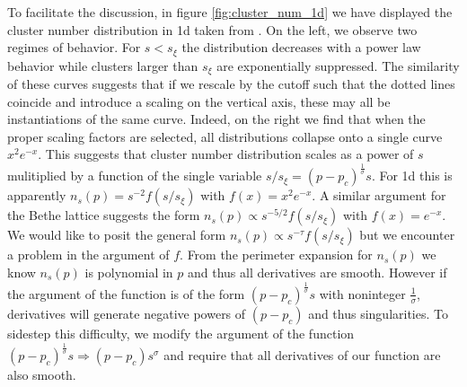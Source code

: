 To facilitate the discussion, in figure
\ref{fig:cluster_num_1d} we have displayed the cluster number distribution in 1d
taken from \cite{Christensen2002}.  On the left, we observe two regimes of behavior.
For $s<s_\xi$ the distribution decreases with a power law behavior while clusters
larger than $s_\xi$ are exponentially suppressed. The similarity of these curves
suggests that if we rescale by the cutoff such that the dotted lines coincide
and introduce a scaling on the vertical axis, these may all be instantiations
of the same curve.  Indeed, on the right we find that when the proper scaling
factors are selected, all distributions collapse onto a single curve $x^2 e^{-x}$.
This suggests that cluster number distribution scales as a power of $s$
mulitiplied by a function
of the single variable $s/s_\xi = (p-p_c)^{\frac{1}{\sigma}}s$. For 1d
this is apparently $n_s(p) = s^{-2} f(s/s_\xi)$ with $f(x) = x^2 e^{-x}$.
A similar argument for the Bethe lattice suggests the form 
$n_s(p) \propto s^{-5/2} f(s/s_\xi)$ with $f(x) = e^{-x}$.  We would like to
posit the general form $n_s(p) \propto s^{-\tau} f(s/s_\xi)$ but we
encounter a problem in the argument of $f$. From the 
perimeter expansion for $n_s(p)$ we
know $n_s(p)$ is polynomial in $p$ and thus all derivatives are smooth.
However if the argument of the function is of the form $(p-p_c)^{\frac{1}{\sigma}}s$
 with noninteger 
$\frac{1}{\sigma}$, derivatives will generate negative powers of $(p - p_c)$
and thus singularities. To sidestep this difficulty, we modify the argument of
the function $(p-p_c)^{\frac{1}{\sigma}}s \Rightarrow (p-p_c)s^\sigma$
and require that all derivatives of our function are also smooth.

